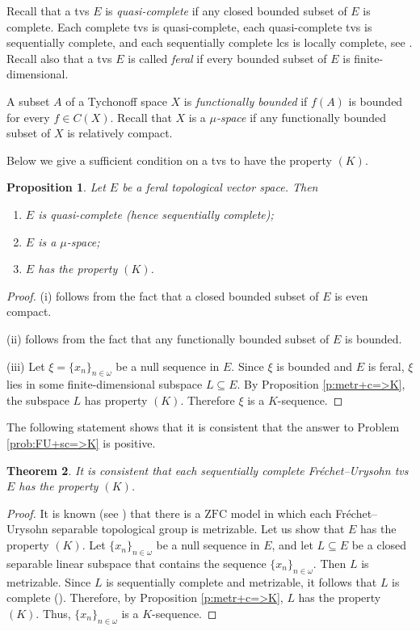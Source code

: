 \documentclass[preprint,11pt]{elsarticle}
\newtheorem{theorem}{Theorem}[section]
\newtheorem{proposition}[theorem]{Proposition}
\theoremstyle{definition}
\theoremstyle{remark}
\numberwithin{equation}{section}
\numberwithin{theorem}{section}
\newcommand{\w}{\omega}
\begin{document}
Recall that a tvs $E$ is {\em quasi-complete} if any closed bounded subset of $E$ is complete. Each complete tvs is quasi-complete,  each quasi-complete tvs is sequentially complete, and each sequentially complete lcs is locally complete, see \cite{Jar}. Recall also that a tvs $E$ is called {\em feral} if every bounded subset of $E$ is finite-dimensional.

A subset $A$ of a Tychonoff space $X$ is {\em functionally bounded} if $f(A)$ is bounded for every $f\in C(X)$.
Recall that  $X$ is a {\em $\mu$-space} if any functionally bounded subset of $X$ is relatively compact.

Below we give a sufficient condition on a tvs to have the property $(K)$.

\begin{proposition} \label{p:feral-K}
Let $E$ be a feral topological vector space. Then
\begin{enumerate}
\item[{\rm (i)}] $E$ is quasi-complete {\rm(}hence sequentially complete{\rm)};
\item[{\rm (ii)}] $E$ is a $\mu$-space;
\item[{\rm (iii)}] $E$ has  the property $(K)$.
\end{enumerate}
\end{proposition}

\begin{proof}
(i) follows from the fact that a closed bounded subset of $E$ is even compact.

(ii) follows from the fact that any functionally bounded subset of $E$ is bounded.

(iii) Let $\xi=\{x_n\}_{n\in\w}$ be a null sequence in $E$. Since $\xi$ is bounded and $E$ is feral, $\xi$ lies in some finite-dimensional subspace $L\subseteq E$. By Proposition \ref{p:metr+c=>K}, the subspace $L$ has property $(K)$. Therefore $\xi$ is a $K$-sequence.
\end{proof}




The following statement shows that it is consistent  that the answer to Problem \ref{prob:FU+sc=>K} is positive.
%
\begin{theorem} \label{t:FU_sc_tvs=>K}
It is consistent that each sequentially complete Fr\'{e}chet--Urysohn tvs $E$ has the property $(K)$.
\end{theorem}

\begin{proof}
It is known (see \cite{HrusakRamos-Garcia2014}) that there is a $\mathrm{ZFC}$ model in which each Fr\'{e}chet--Urysohn separable topological group is metrizable. Let us show that $E$ has the property $(K)$. Let $\{x_n\}_{n\in\w}$ be a null sequence in $E$, and let $L\subseteq E$ be a closed separable linear subspace that contains the sequence $\{x_n\}_{n\in\w}$. Then $L$ is metrizable. Since $L$ is sequentially complete and metrizable, it follows that $L$ is complete (\cite[Proposition~3.2.2]{Jar}). Therefore, by Proposition \ref{p:metr+c=>K},  $L$ has the property $(K)$. Thus, $\{x_n\}_{n\in\w}$ is a $K$-sequence.
\end{proof}
\end{document}
